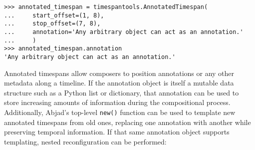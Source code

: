 \begin{comment}
<abjad>
annotated_timespan = timespantools.AnnotatedTimespan(
    start_offset=(1, 8),
    stop_offset=(7, 8),
    annotation='Any arbitrary object can act as an annotation.'
    )
annotated_timespan.annotation
</abjad>
\end{comment}

\begin{singlespacing}
\vspace{-0.5\baselineskip}
\begin{lstlisting}
>>> annotated_timespan = timespantools.AnnotatedTimespan(
...     start_offset=(1, 8),
...     stop_offset=(7, 8),
...     annotation='Any arbitrary object can act as an annotation.'
...     )
>>> annotated_timespan.annotation
'Any arbitrary object can act as an annotation.'
\end{lstlisting}
\end{singlespacing}

\noindent Annotated timespans allow composers to position annotations or any
other metadata along a timeline. If the annotation object is itself a mutable
data structure such as a Python list or dictionary, that annotation can be used
to store increasing amounts of information during the compositional process.
Additionally, Abjad's top-level \texttt{new()} function can be used to template
new annotated timespans from old ones, replacing one annotation with another
while preserving temporal information. If that same annotation object supports
templating, nested reconfiguration can be performed:

\begin{comment}
<abjad>
metadata_timespan = new(annotated_timespan,
    stop_offset=(3, 2),
    annotation={
        'durations': ((1, 8), (1, 8), (3, 16)),
        'dynamic': indicatortools.Dynamic('ppp'),
        'pitch_segment': pitchtools.PitchSegment([0, 1, 4, 7]),
        },
    )
metadata_timespan.annotation['bow_contact_point'] = Multiplier(1, 3)
print(format(metadata_timespan))
</abjad>
\end{comment}

